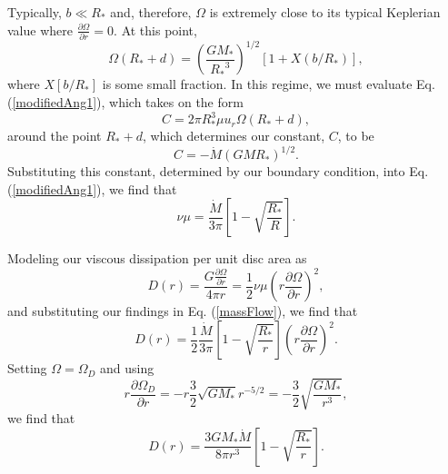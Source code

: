 \documentclass[aps,pra,twocolumn]{revtex4-1}
\begin{document}
Typically, $b \ll R_*$ and, therefore, $\Omega$ is extremely close to its typical Keplerian value where $\frac{\partial \Omega}{\partial r} = 0$.  At this point,
\begin{equation}
\Omega(R_* + d) = \left(\frac{GM_*}{{R_*}^3} \right)^{1/2} \left[1 + X(b/R_*) \right],
\end{equation}
where $X[b/R_*]$ is some small fraction.  In this regime, we must evaluate Eq. (\ref{modifiedAng1}), which takes on the form
\begin{equation}
C = 2\pi R_*^3 \mu u_r \Omega(R_* + d) , \nonumber
\end{equation}
around the point $R_* + d$, which determines our constant, $C$, to be
\begin{equation}
C = - \dot{M}(G M R_*)^{1/2}. \nonumber
\end{equation}
Substituting this constant, determined by our boundary condition, into Eq. (\ref{modifiedAng1}), we find that
\begin{equation}
\nu \mu = \frac{\dot{M}}{3\pi}\left[ 1 - \sqrt{\frac{R_*}{R}} \right]. \label{massFlow}
\end{equation}

Modeling our viscous dissipation per unit disc area as \cite{king2002}
\begin{equation}
D(r) = \frac{G \frac{\partial\Omega}{\partial r}}{4\pi r}= \frac{1}{2}\nu \mu (r\frac{\partial\Omega}{\partial r})^2,
\end{equation}
and substituting our findings in Eq. (\ref{massFlow}), we find that
\begin{equation}
D(r) =\frac{1}{2}\frac{\dot{M}}{3\pi}\left[ 1 - \sqrt{\frac{R_*}{r}} \right] (r\frac{\partial\Omega}{\partial r})^2. \nonumber
\end{equation}
Setting $\Omega = \Omega_D$ and using
\begin{equation}
r\frac{\partial\Omega_D}{\partial r} = -r\frac{3}{2}\sqrt{G M_*}r^{-5/2} = -\frac{3}{2}\sqrt{\frac{G M_*}{r^3}},
\end{equation}
we find that
\begin{equation}
D(r) = \frac{3GM_*\dot{M}}{8\pi r^3}\left[ 1 - \sqrt{\frac{R_*}{r}} \right].
\end{equation}
\end{document}
